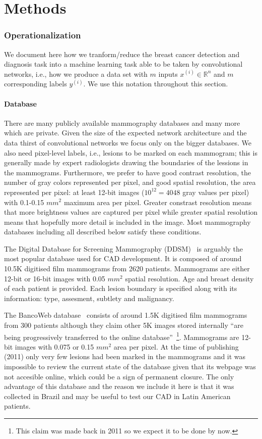 \documentclass[11pt]{article}
\begin{document}
	\part{Methods}
	\section{Operationalization}
	We document here how we tranform/reduce the breast cancer detection and diagnosis task into a machine learning task able to be taken by convolutional networks, i.e., how we produce a data set with $m$ inputs $x^{(i)} \in \mathbb{R}^n$ and $m$ corresponding labels $y^{(i)}$. We use this notation throughout this section. 

	\subsection{Database}
	There are many publicly available mammography databases and many more which are private. Given the size of the expected network architecture and the data thirst of convolutional networks we focus only on the bigger databases. We also need pixel-level labels, i.e., lesions to be marked on each mammogram; this is generally made by expert radiologists drawing the boundaries of the lessions in the mammograms.
Furthermore, we prefer to have good contrast resolution, the number of gray colors represented per pixel, and good spatial resolution, the area represented per pixel: at least 12-bit images ($10^12 = 4048$ gray values per pixel) with 0.1-0.15 $mm^2$ maximum area per pixel. Greater constrast resolution means that more brightness values are captured per pixel while greater spatial resolution means that hopefully more detail is included in the image. Most mammography databases including all described below satisfy these conditions.
 
	The Digital Database for Screening Mammography (DDSM)~\cite{Heath2001} is arguably the most popular database used for CAD development. It is composed of around 10.5K digitised film mammograms from 2620 patients. Mammograms are either 12-bit or 16-bit images with 0.05 $mm^2$ spatial resolution. Age and breast density of each patient is provided. Each lesion boundary is specified along with its information: type, assesment, subtlety and malignancy.

	The BancoWeb database~\cite{Nepomuceno2011} consists of around 1.5K digitised film mammograms from 300 patients although they claim other 5K images stored internally ``are being progressively transferred to the online database''~\footnote{This claim was made back in 2011 so we expect it to be done by now.}. Mammograms are 12-bit images with 0.075 or 0.15 $mm^2$ area per pixel. At the time of publishing (2011) only very few lesions had been marked in the mammograms and it was impossible to review the current state of the database given that its webpage was not accesible online, which could be a sign of permanent closure. The only advantage of this database and the reason we include it here is that it was collected in Brazil and may be useful to test our CAD in Latin American patients.
\end{document}
